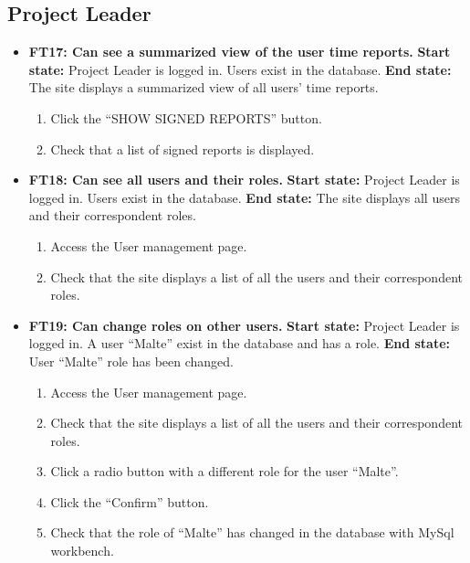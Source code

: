\documentclass{article}
\begin{document}
\subsection{Project Leader}
\begin{itemize}
		\item \textbf{FT17: Can see a summarized view of the user time reports.}\newline
		\textbf{Start state:} Project Leader is logged in. Users exist in the database.\newline
		\textbf{End state:} The site displays a summarized view of all users' time reports.
		\begin{enumerate}
			\item Click the “SHOW SIGNED REPORTS” button.
			\item Check that a list of signed reports is displayed.
		\end{enumerate}
		
		\item \textbf{FT18: Can see all users and their roles.}\newline
		\textbf{Start state:} Project Leader is logged in. Users exist in the database.  \newline
		\textbf{End state:} The site displays all users and their correspondent roles.
		\begin{enumerate}
			\item Access the User management page.
			\item Check that the site displays a list of all the users and their correspondent roles. 
		\end{enumerate}
		
		\item \textbf{FT19: Can change roles on other users.}\newline
		\textbf{Start state:} Project Leader is logged in. A user “Malte” exist in the database and has a role.\newline
		\textbf{End state:} User “Malte” role has been changed.
		\begin{enumerate}
			\item Access the User management page.
			\item Check that the site displays a list of all the users and their correspondent roles.
			\item Click a radio button with a different role for the user “Malte”.
			\item Click the “Confirm” button.
			\item Check that the role of “Malte” has changed in the database with MySql workbench.
		\end{enumerate}
		

\end{itemize}
\end{document}
